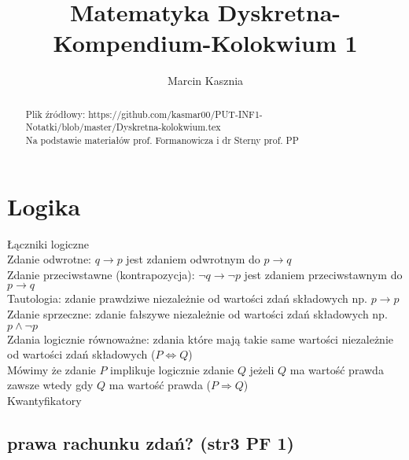 \documentclass[a4paper,12pt]{article}
\title{Matematyka Dyskretna-Kompendium-Kolokwium 1}
\author{Marcin Kasznia}
\begin{document}
\maketitle
\begin{abstract}
Plik źródłowy: https://github.com/kasmar00/PUT-INF1-Notatki/blob/master/Dyskretna-kolokwium.tex \\
Na podstawie materiałów prof. Formanowicza i dr Sterny prof. PP\\
\end{abstract}

\section{Logika}
Łączniki logiczne \\
Zdanie odwrotne: $q \to p$ jest zdaniem odwrotnym do $p \to q$ \\
Zdanie przeciwstawne (kontrapozycja): $\neg q \to \neg p$ jest zdaniem przeciwstawnym do $p \to q$ \\
Tautologia: zdanie prawdziwe niezależnie od wartości zdań składowych np. $p\to p$ \\
Zdanie sprzeczne: zdanie fałszywe niezależnie od wartości zdań składowych np. $p \land \neg p $ \\
Zdania logicznie równoważne: zdania które mają takie same wartości niezależnie od wartości zdań składowych ($P \Leftrightarrow Q $) \\
Mówimy że zdanie $P$ implikuje logicznie zdanie $Q$ jeżeli $Q$ ma wartość prawda zawsze wtedy gdy $Q$ ma wartość prawda ($P \Rightarrow Q$)\\
Kwantyfikatory
\subsection{prawa rachunku zdań? (str3 PF 1)}
\end{document}
